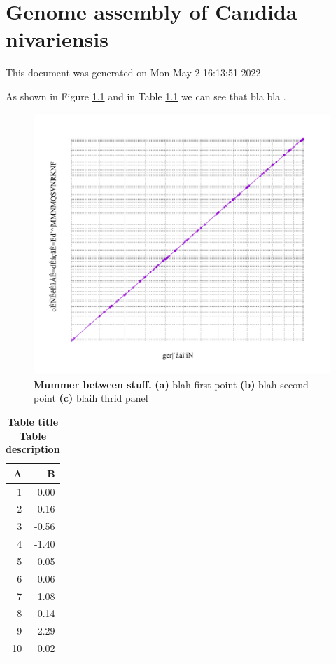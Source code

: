 \chapter{Genome assembly of Candida nivariensis}
\label{chap:rnw}





This document was generated on Mon May  2 16:13:51 2022.

As shown in Figure \ref{fig:mummer} and in Table \ref{tab:rtab1} we can see that bla bla \citep{B}.


\begin{figure}[!ht]
\centering
\includegraphics[width = 1\linewidth,keepaspectratio]{figure/mummer.pdf}
\caption[Mummer between stuff]{{\bf Mummer between stuff.} {\bf (a)} blah first point {\bf (b)} blah second point {\bf (c)} blaih thrid panel  }
\label{fig:mummer}
\end{figure}




\begin{table}[ht]
\centering
\begin{tabular}{rr}
  \hline
A & B \\ 
  \hline
  1 & 0.00 \\ 
    2 & 0.16 \\ 
    3 & -0.56 \\ 
    4 & -1.40 \\ 
    5 & 0.05 \\ 
    6 & 0.06 \\ 
    7 & 1.08 \\ 
    8 & 0.14 \\ 
    9 & -2.29 \\ 
   10 & 0.02 \\ 
   \hline
\end{tabular}
\caption{\bf{ Table title } Table description} 
\label{tab:rtab1}
\end{table}

